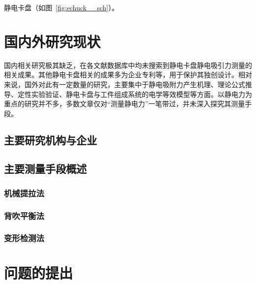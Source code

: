 静电卡盘（如图~\ref{fig:echuck__sch}）。



\section{国内外研究现状}

国内相关研究极其缺乏，在各文献数据库中均未搜索到静电卡盘静电吸引力测量的相关成果。其他静电卡盘相关的成果多为企业专利等，用于保护其独创设计。相对来说，国外对此有一定数量的研究，主要集中于静电吸附力产生机理、理论公式推导、定性实验验证、静电卡盘与工件组成系统的电学等效模型等方面。以静电力为重点的研究并不多，多数文章仅对“测量静电力”一笔带过，并未深入探究其测量手段。


\subsection{主要研究机构与企业}


\subsection{主要测量手段概述}\label{sec:priorArt}

\subsubsection{机械提拉法}\label{sec:priorArt-pull}
\subsubsection{背吹平衡法}\label{sec:priorArt-backside}
\subsubsection{变形检测法}\label{sec:priorArt-warp}


\section{问题的提出}


\begin{comment}
\subsection{工程需求}
\subsection{论文研究内容}
\subsection{对专项课题的推进作用}
\end{comment}